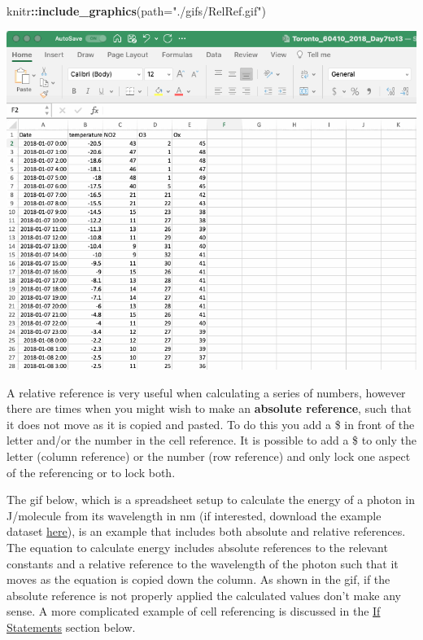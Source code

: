 \documentclass[
]{book}
\newenvironment{Shaded}{\begin{snugshade}}{\end{snugshade}}
\newcommand{\AttributeTok}[1]{\textcolor[rgb]{0.13,0.29,0.53}{#1}}
\newcommand{\FunctionTok}[1]{\textcolor[rgb]{0.13,0.29,0.53}{\textbf{#1}}}
\newcommand{\NormalTok}[1]{#1}
\newcommand{\SpecialCharTok}[1]{\textcolor[rgb]{0.81,0.36,0.00}{\textbf{#1}}}
\newcommand{\StringTok}[1]{\textcolor[rgb]{0.31,0.60,0.02}{#1}}
\begin{document}
\begin{Shaded}
\begin{Highlighting}[]
\NormalTok{knitr}\SpecialCharTok{::}\FunctionTok{include\_graphics}\NormalTok{(}\AttributeTok{path=}\StringTok{"./gifs/RelRef.gif"}\NormalTok{)}
\end{Highlighting}
\end{Shaded}

\includegraphics{./gifs/RelRef.gif}

A relative reference is very useful when calculating a series of numbers, however there are times when you might wish to make an \textbf{absolute reference}, such that it does not move as it is copied and pasted. To do this you add a \$ in front of the letter and/or the number in the cell reference. It is possible to add a \$ to only the letter (column reference) or the number (row reference) and only lock one aspect of the referencing or to lock both.

The gif below, which is a spreadsheet setup to calculate the energy of a photon in J/molecule from its wavelength in nm (if interested, download the example dataset \href{./datasets/Relative_Referencing_Exercise.csv}{here}), is an example that includes both absolute and relative references. The equation to calculate energy includes absolute references to the relevant constants and a relative reference to the wavelength of the photon such that it moves as the equation is copied down the column. As shown in the gif, if the absolute reference is not properly applied the calculated values don't make any sense. A more complicated example of cell referencing is discussed in the \protect\hyperlink{if-statements}{If Statements} section below.
\end{document}
